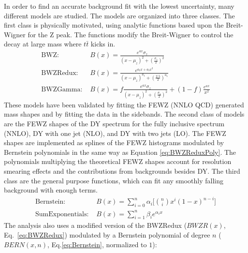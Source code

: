 In order to find an accurate background fit with the lowest uncertainty, many different models are studied. The models are organized into three classes. The first class is physically motivated, using analytic functions based upon the Breit-Wigner for the Z peak. The functions modify the Breit-Wigner to control the decay at large mass where $t\bar{t}$ kicks in. 
\begin{align}
        \label{eq:BWZ}
        \text{BWZ: }& {B(x)} = {\frac{e^{ax}\sigma_{z}}{(x-\mu_{z})^2 + (\frac{\sigma_{z}}{2})^2}} \\
        \label{eq:BWZRedux}
        \text{BWZRedux: }& {B(x)} = {\frac{e^{a_{2}x + a_{3}x^2}}{(x-\mu_{z})^{a_{1}} + (\frac{2.5}{2})^{a_{1}}}} \\
        \label{eq:BWZGamma}
        \text{BWZGamma: }& {B(x)} = {f\frac{e^{ax}\sigma_{z}}{(x-\mu_{z})^2 + (\frac{\sigma_{z}}{2})^2} + (1-f)\frac{e^{ax}}{x^2}}
\end{align}
These models have been validated by fitting the FEWZ (NNLO QCD) generated mass shapes and by fitting the data in the sidebands. The second class of models are the FEWZ shapes of the DY spectrum for the fully inclusive spectrum (NNLO), DY with one jet (NLO), and DY with two jets (LO). The FEWZ shapes are implemented as splines of the FEWZ histograms modulated by Bernstein polynomials in the same way as Equation \ref{eq:BWZReduxPoly}. The polynomials multiplying the theoretical FEWZ shapes account for resolution smearing effects and the contributions from backgrounds besides DY. The third class are the general purpose functions, which can fit any smoothly falling background with enough terms.
\begin{align}
        \label{eq:Bernstein}
        \text{Bernstein: }& {B(x)} = {\sum_{i=0}^{n} \alpha_i[\binom{n}{i}x^{i}(1-x)^{n-i}}] \\
        \label{eq:SumExponentials}
        \text{SumExponentials: }& {B(x)} = {\sum_{i=1}^{n} \beta_{i}e^{\alpha_{i}x}}
\end{align}
The analysis also uses a modified version of the BWZRedux ($BWZR(x)$, Eq.~\ref{eq:BWZRedux}) modulated by a Bernstein polynomial of degree $n$ ($BERN(x,n)$, Eq.\ref{eq:Bernstein}, normalized to $1$):
